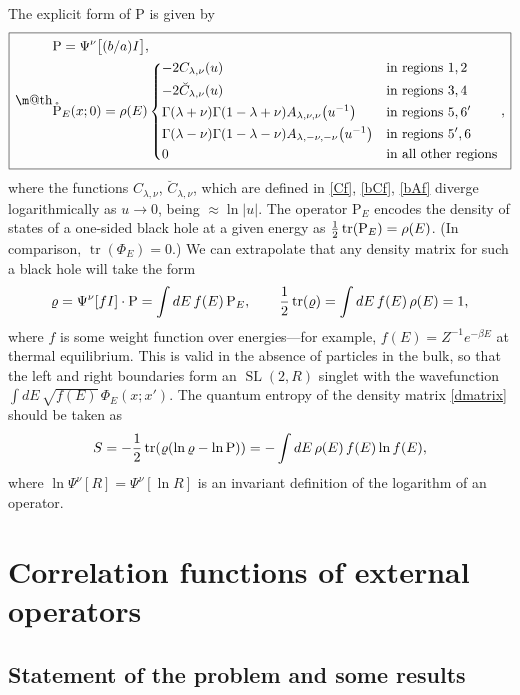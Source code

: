 \documentclass[11pt]{article}
\makeatletter
\newcommand{\be}{\begin{equation}}
\newcommand{\ee}{\end{equation}}
\newcommand*{\wideboxed}[1]{\setlength{\fboxsep}{1ex}%
  \fbox{\m@th$\displaystyle#1$}}
\newcommand{\RR}{\mathbb{R}}
\DeclareMathOperator{\tr}{tr}
\DeclareMathOperator{\tSL}{\widetilde{\mathrm{SL}}}
\newcommand{\bC}{\breve{C}}
\newcommand{\Rho}{\mathrm{P}}
\newcommand{\lam}{\lambda}
\newcommand{\ov}{\over}
\def\widetilde#1{#1}%
\def\RR{R}
\makeatother
\begin{document}
The explicit form of $\Rho$ is given by
\be \label{Rho}
\wideboxed{\begin{aligned}
&\Rho=\Psi^{\nu}\bigl[(b/a)I\bigr],\\
&\mathring{\Rho}_E(x;0)= \rho(E)\begin{dcases}
 -2 C_{\lam, \nu}(u) & \text{in regions $1, 2$}\\
-2  \bC_{\lam, \nu}(u)&  \text{in regions $3, 4$}\\
\Gamma(\lam+\nu)\Gamma(1-\lam+\nu)A_{\lam, \nu, \nu}\bigl(u^{-1}\bigr) & \text{in regions $5, 6'$}\\
\Gamma(\lam-\nu)\Gamma(1-\lam-\nu)A_{\lam, -\nu, -\nu}\bigl(u^{-1}\bigr) & \text{in regions $5', 6$}\\
0 & \text{in all other regions}
\end{dcases},
\end{aligned}}
\ee 
where the functions $C_{\lam, \nu}$, $\bC_{\lam, \nu}$, which are defined in \eqref{Cf}, \eqref{bCf}, \eqref{bAf} diverge logarithmically as $u \to 0$, being $\approx \ln |u|$. The operator $\Rho_E$ encodes the density of states of a one-sided black hole at a given energy as ${1 \ov 2}\tr(\Rho_E)=\rho(E)$. (In comparison, $\tr(\Phi_E)=0$.) We can extrapolate that any density matrix for such a black hole will take the form 
\be \label{dmatrix}
\varrho=\Psi^{\nu}[fI]\cdot\Rho=\int dE\, f(E)\,\Rho_E, \qquad {1 \ov 2}\tr(\varrho)=\int dE\, f(E)\,\rho(E)=1,
\ee
where $f$ is some weight function over energies---for example, $f(E)=Z^{-1}e^{-\beta E}$ at thermal equilibrium. This is valid in the absence of particles in the bulk, so that the left and right boundaries form an $\tSL(2,\RR)$ singlet with the wavefunction $\int dE\,\sqrt{f(E)}\,\Phi_E(x;x')$. The quantum entropy of the density matrix \eqref{dmatrix} should be taken as
\be
S=-{1 \ov 2}\tr(\varrho(\ln \varrho-\ln \Rho))=-\int dE\, \rho(E)\,f(E)\ln f(E),
\ee
where $\ln \Psi^{\nu}[R]=\Psi^{\nu}[\ln R]$ is an invariant definition of the logarithm of an operator.

\section{Correlation functions of external operators}\label{sec:corr}

\subsection{Statement of the problem and some results}\label{sec:corrgen}
\end{document}
